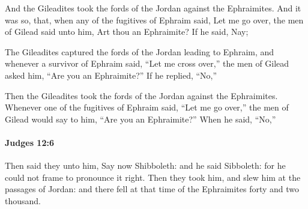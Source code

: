 			\begin{versebox}
					\item[BHS] 
					\item[ASV] And the Gileadites took the fords of the Jordan against the Ephraimites. And it was so, that, when any of the fugitives of Ephraim said, Let me go over, the men of Gilead said unto him, Art thou an Ephraimite? If he said, Nay;
					\item[NIV] The Gileadites captured the fords of the Jordan leading to Ephraim, and whenever a survivor of Ephraim said, “Let me cross over,” the men of Gilead asked him, “Are you an Ephraimite?” If he replied, “No,”
					\item[NRSV] Then the Gileadites took the fords of the Jordan against the Ephraimites. Whenever one of the fugitives of Ephraim said, “Let me go over,” the men of Gilead would say to him, “Are you an Ephraimite?” When he said, “No,”
			\end{versebox}

		\paragraph{Judges 12:6} %
			\label{JUDGES-12-6}

			Then said they unto him, Say now Shibboleth: and he said Sibboleth: for he could not frame to pronounce it right. Then they took him, and slew him at the passages of Jordan: and there fell at that time of the Ephraimites forty and two thousand.

